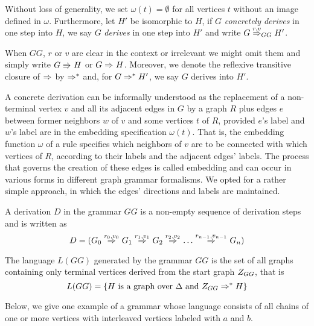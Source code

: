 \documentclass[runningheads]{llncs}
\begin{document}
Without loss of generality, we set $\omega(t) = \emptyset$ for all vertices $t$ without an image defined in $\omega$. Furthermore, let $H'$ be isomorphic to $H$, if $G$ \textit{concretely derives} in one step into $H$, we say $G$ \textit{derives} in one step into $H'$ and write $G \deriv{r}{v}{GG} H'$. 
	
When $GG$, $r$ or $v$ are clear in the context or irrelevant we might omit them and simply write $G \cderiv{}{}{} H$ or $G \deriv{}{}{} H$. Moreover, we denote the reflexive transitive closure of $\deriv{}{}{}$ by $\Rightarrow^*_{}$ and, for $G \Rightarrow^*_{} H'$, we say $G$ derives into $H'$.

A concrete derivation can be informally understood as the replacement of a non-terminal vertex $v$ and all its adjacent edges in $G$ by a graph $R$ plus edges $e$ between former neighbors $w$ of $v$ and some vertices $t$ of $R$, provided $e$'s label and $w$'s label are in the embedding specification $\omega(t)$. That is, the embedding function $\omega$ of a rule specifies which neighbors of $v$ are to be connected with which vertices of $R$, according to their labels and the adjacent edges' labels. The process that governs the creation of these edges is called embedding and can occur in various forms in different graph grammar formalisms. We opted for a rather simple approach, in which the edges' directions and labels are maintained.

\begin{definition}
	A derivation $D$ in the grammar $GG$ is a non-empty sequence of derivation steps and is written as
	\begin{equation*}
		D = (G_0 \deriv{r_0}{v_0}{} G_1 \deriv{r_1}{v_1}{} G_2 \deriv{r_2}{v_2}{} \dots \deriv{r_{n-1}}{v_{n-1}}{} G_n)
	\end{equation*}
\end{definition}

\begin{definition}
	\label{def:language}
	The language $L(GG)$ generated by the grammar $GG$ is the set of all graphs containing only terminal vertices derived from the start graph $Z_{GG}$, that is
	\begin{equation*}
		L(GG) = \{H \text{ is a graph over } \Delta \text{ and } Z_{GG} \Rightarrow^*_{} H\}
	\end{equation*}
\end{definition}

Below, we give one example of a grammar whose language consists of all chains of one or more vertices with interleaved vertices labeled with $a$ and $b$.
\end{document}
